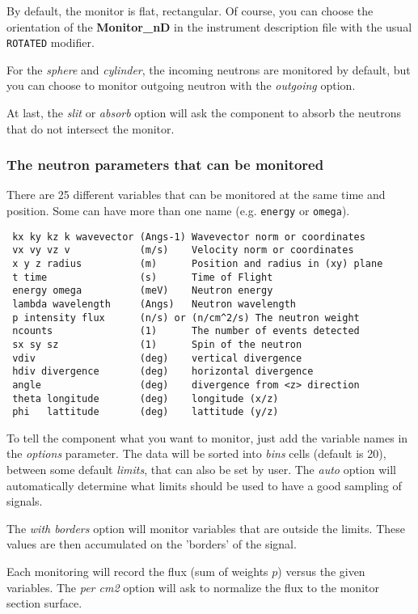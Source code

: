 By default, the monitor is flat, rectangular. Of course, you can choose
the orientation of the {\bf Monitor\_nD} in the instrument description
file with the usual \texttt{ROTATED} modifier.

For the {\it sphere} and {\it cylinder}, the incoming neutrons are
monitored by default, but you can choose to monitor outgoing neutron
with the {\it outgoing} option.

At last, the {\it slit} or {\it absorb} option will ask the component to
absorb the neutrons that do not intersect the monitor.

\subsubsection{The neutron parameters that can be monitored}

There are 25 different variables that can be monitored at the same time
and position. Some can have more than one name (e.g. \texttt{energy} or
\texttt{omega}).


\begin{verbatim}
 kx ky kz k wavevector (Angs-1) Wavevector norm or coordinates
 vx vy vz v            (m/s)    Velocity norm or coordinates
 x y z radius          (m)      Position and radius in (xy) plane
 t time                (s)      Time of Flight
 energy omega          (meV)    Neutron energy
 lambda wavelength     (Angs)   Neutron wavelength
 p intensity flux      (n/s) or (n/cm^2/s) The neutron weight
 ncounts               (1)      The number of events detected
 sx sy sz              (1)      Spin of the neutron
 vdiv                  (deg)    vertical divergence
 hdiv divergence       (deg)    horizontal divergence
 angle                 (deg)    divergence from <z> direction
 theta longitude       (deg)    longitude (x/z)
 phi   lattitude       (deg)    lattitude (y/z)
\end{verbatim}

To tell the component what you want to monitor, just add the variable
names in the {\it options} parameter. The data will be sorted into {\it
  bins} cells (default is 20), between some default {\it limits}, that
can also be set by user. The {\it auto} option will automatically
determine what limits should be used to have a good sampling of signals.

The {\it with borders} option will monitor variables that are outside
the limits. These values are then accumulated on the 'borders' of the
signal.

Each monitoring will record the flux (sum of weights $p$) versus the
given variables. The {\it per cm2} option will ask to normalize the flux
to the monitor section surface.

